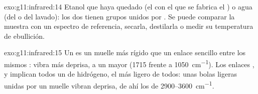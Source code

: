 \begin{solution}{exo:g11:infrared:14}
Etanol que haya quedado (el  con el que se fabrica el ) o
agua (del  o del lavado): los dos tienen grupos  unidos por
. Se puede comparar la muestra con un espectro de
referencia, secarla, destilarla o medir su temperatura de ebullición.
\end{solution}

\begin{solution}{exo:g11:infrared:15}
Un  es un muelle más rígido que un enlace sencillo entre los
mismos : vibra más deprisa, a un  mayor (1715 frente
a \qty{1050}{cm^{-1}}). Los enlaces ,  y 
implican todos un  de hidrógeno, el más ligero de todos: unas bolas
ligeras unidas por un muelle vibran deprisa, de ahí los 
de 2900--\qty{3600}{cm^{-1}}.
\end{solution}

